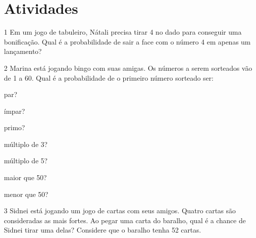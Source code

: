 \section*{Atividades}

\num{1} Em um jogo de tabuleiro, Nátali precisa tirar 4 no dado para
conseguir uma bonificação. Qual é a probabilidade de sair a face com o
número 4 em apenas um lançamento?




\num{2} Marina está jogando bingo com suas amigas. Os números a serem
sorteados vão de 1 a 60. Qual é a probabilidade de o primeiro número 
sorteado ser:

\begin{escolha}[itemsep=0pt]
\item par?
\item ímpar?
\item primo?
\item múltiplo de 3?
\item múltiplo de 5?
\item maior que 50?
\item menor que 50?
\end{escolha}








\num{3} Sidnei está jogando um jogo de cartas com seus amigos. Quatro cartas são
consideradas as mais fortes. Ao pegar uma carta do baralho, qual é a
chance de Sidnei tirar uma delas? Considere que o baralho tenha 52
cartas.


